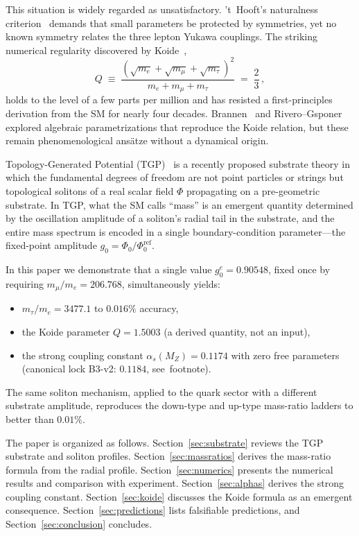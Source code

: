 \documentclass[11pt,a4paper]{article}
\newcommand{\gz}{g_0^e}
\newcommand{\as}{\alpha_s}
\newcommand{\MZ}{M_Z}
\newcommand{\mt}{m_\tau}
\newcommand{\mmu}{m_\mu}
\newcommand{\me}{m_e}
\begin{document}
This situation is widely regarded as unsatisfactory.
't~Hooft's naturalness criterion~\cite{tHooft1980} demands that
small parameters be protected by symmetries, yet no known symmetry
relates the three lepton Yukawa couplings.  The striking numerical
regularity discovered by Koide~\cite{Koide2007},
\begin{equation}\label{eq:koide-intro}
  Q \;\equiv\; \frac{(\sqrt{\me}+\sqrt{\mmu}+\sqrt{\mt})^{2}}
                     {\me + \mmu + \mt}
  \;=\; \frac{2}{3}\,,
\end{equation}
holds to the level of a few parts per million and has resisted
a first-principles derivation from the SM for nearly four decades.
Brannen~\cite{Brannen2006} and Rivero--Gsponer~\cite{Rivero2005}
explored algebraic parametrizations that reproduce the Koide
relation, but these remain phenomenological ans\"atze without
a dynamical origin.

Topology-Generated Potential (TGP)~\cite{Serafin2026-full,TGP-repo}
is a recently proposed substrate theory in which the fundamental
degrees of freedom are not point particles or strings but
topological solitons of a real scalar field $\Phi$ propagating
on a pre-geometric substrate.  In TGP, what the SM calls
``mass'' is an emergent quantity determined by the oscillation
amplitude of a soliton's radial tail in the substrate, and the
entire mass spectrum is encoded in a single boundary-condition
parameter---the fixed-point amplitude $g_0 = \Phi_0 / \Phi_0^{\mathrm{ref}}$.

In this paper we demonstrate that a single value
$\gz = 0.90548$, fixed once by requiring
$\mmu/\me = 206.768$, simultaneously yields:
\begin{itemize}
  \item $\mt/\me = 3477.1$ to $0.016\%$ accuracy,
  \item the Koide parameter $Q = 1.5003$ (a derived quantity, not an input),
  \item the strong coupling constant
        $\as(\MZ) = 0.1174$ with zero free parameters
        (canonical lock B3-v2: $0.1184$, see~footnote).
\end{itemize}
The same soliton mechanism, applied to the quark sector with a
different substrate amplitude, reproduces the down-type and up-type
mass-ratio ladders to better than $0.01\%$.

The paper is organized as follows.
Section~\ref{sec:substrate} reviews the TGP substrate and soliton
profiles.
Section~\ref{sec:massratios} derives the mass-ratio formula from the
radial profile.
Section~\ref{sec:numerics} presents the numerical results and
comparison with experiment.
Section~\ref{sec:alphas} derives the strong coupling constant.
Section~\ref{sec:koide} discusses the Koide formula as an emergent
consequence.
Section~\ref{sec:predictions} lists falsifiable predictions,
and Section~\ref{sec:conclusion} concludes.
\end{document}
